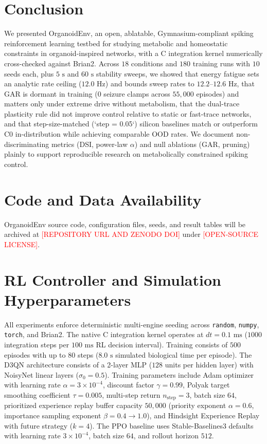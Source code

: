\documentclass[journal]{IEEEtran}
\begin{document}
\section{Conclusion}
\label{sec:conclusion}
We presented OrganoidEnv, an open, ablatable, Gymnasium-compliant spiking reinforcement learning testbed for studying metabolic and homeostatic constraints in organoid-inspired networks, with a C integration kernel numerically cross-checked against Brian2. Across $18$ conditions and $180$ training runs with $10$ seeds each, plus $5\text{ s}$ and $60\text{ s}$ stability sweeps, we showed that energy fatigue sets an analytic rate ceiling ($12.0\text{ Hz}$) and bounds sweep rates to $12.2\text{--}12.6\text{ Hz}$, that GAR is dormant in training ($0$ seizure clamps across $55{,}000$ episodes) and matters only under extreme drive without metabolism, that the dual-trace plasticity rule did not improve control relative to static or fast-trace networks, and that step-size-matched (`step = 0.05`) silicon baselines match or outperform C0 in-distribution while achieving comparable OOD rates. We document non-discriminating metrics (DSI, power-law $\alpha$) and null ablations (GAR, pruning) plainly to support reproducible research on metabolically constrained spiking control.

\section*{Code and Data Availability}
OrganoidEnv source code, configuration files, seeds, and result tables will be archived at \textcolor{red}{[REPOSITORY URL AND ZENODO DOI]} under \textcolor{red}{[OPEN-SOURCE LICENSE]}.




\appendices

\section{RL Controller and Simulation Hyperparameters}
\label{app:hyperparams}
All experiments enforce deterministic multi-engine seeding across \texttt{random}, \texttt{numpy}, \texttt{torch}, and Brian2. The native C integration kernel operates at $dt = 0.1\text{ ms}$ ($1000$ integration steps per $100\text{ ms}$ RL decision interval). Training consists of $500$ episodes with up to $80$ steps ($8.0\text{ s}$ simulated biological time per episode). The D3QN architecture consists of a 2-layer MLP ($128$ units per hidden layer) with NoisyNet linear layers ($\sigma_0 = 0.5$). Training parameters include Adam optimizer with learning rate $\alpha = 3 \times 10^{-4}$, discount factor $\gamma = 0.99$, Polyak target smoothing coefficient $\tau = 0.005$, multi-step return $n_{\mathrm{step}} = 3$, batch size $64$, prioritized experience replay buffer capacity $50{,}000$ (priority exponent $\alpha = 0.6$, importance sampling exponent $\beta = 0.4 \to 1.0$), and Hindsight Experience Replay with future strategy ($k = 4$). The PPO baseline uses Stable-Baselines3 defaults with learning rate $3 \times 10^{-4}$, batch size $64$, and rollout horizon $512$.
\end{document}
